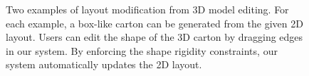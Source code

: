 \begin{figure}
	\centering
	\hspace{4ex}
	\caption{Two examples of layout modification from 3D model editing. For each example, a box-like carton can be generated from the given 2D layout. Users can edit the shape of the 3D carton by dragging edges in our system. By enforcing the shape rigidity constraints, our system automatically updates the 2D layout.}
	\label{fig:editing}
\end{figure}

 
